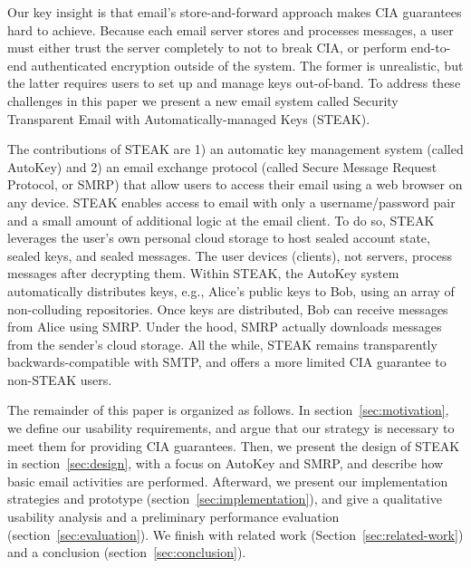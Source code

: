Our key insight is that email's store-and-forward approach makes CIA 
guarantees hard to achieve. Because each email server stores and processes 
messages, a user must either trust the server completely to not to break 
CIA, or perform end-to-end authenticated encryption outside of the system. 
The former is unrealistic, but the latter requires users to set up and 
manage keys out-of-band. To address these challenges in this paper we 
present a new email system called Security Transparent Email with 
Automatically-managed Keys (STEAK). 

The contributions of STEAK are 1) an automatic key management system 
(called AutoKey) and 2) an email exchange protocol (called Secure Message 
Request Protocol, or SMRP) that allow users to access their email using a 
web browser on any device. STEAK enables access to email with only a 
username/password pair and a small amount of additional logic at the 
email client. To do so, STEAK leverages the user's own personal cloud 
storage to host sealed account state, sealed keys, and sealed messages. 
The user devices (clients), not servers, process messages after decrypting 
them. Within STEAK, the AutoKey system automatically distributes keys, 
e.g., Alice's public keys to Bob, using an array of non-colluding 
repositories. Once keys are distributed, Bob can receive 
messages from Alice using SMRP. Under the hood, SMRP 
actually downloads messages from the sender's cloud storage. All the while, 
STEAK remains transparently backwards-compatible with SMTP, and offers 
a more limited CIA guarantee to non-STEAK users.

The remainder of this paper is organized as follows.  In section~\ref{sec:motivation}, 
we define our usability requirements, and argue that our strategy is necessary 
to meet them for providing CIA guarantees. Then, we present the design of STEAK 
in section~\ref{sec:design}, with a focus on AutoKey and SMRP, and describe how basic 
email activities are performed.  Afterward, we present our 
implementation strategies and prototype (section~\ref{sec:implementation}), and give 
a qualitative usability 
analysis and a preliminary performance evaluation (section~\ref{sec:evaluation}).  
We finish with related work (Section~\ref{sec:related-work}) and a conclusion (section~\ref{sec:conclusion}).
